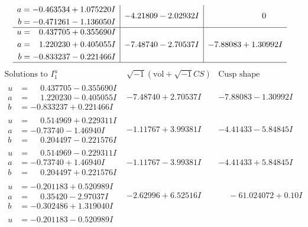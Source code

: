 \documentclass[1p]{elsarticle_modified}
\theoremstyle{definition}
\newcommand{\I}{\sqrt{-1}}
\begin{document}
$$\begin{array}{c|c|c}
\begin{aligned}
a &= -0.463534 + 1.075220 I \\
b &= -0.471261 - 1.136050 I\end{aligned}
 & -4.21809 - 2.02932 I & \phantom{-0.000000 } 0 \\ \hline\begin{aligned}
u &= \phantom{-}0.437705 + 0.355690 I \\
a &= \phantom{-}1.220230 + 0.405055 I \\
b &= -0.833237 - 0.221466 I\end{aligned}
 & -7.48740 - 2.70537 I & -7.88083 + 1.30992 I\\
 \hline 
 \end{array}$$\newpage$$\begin{array}{c|c|c}  
\text{Solutions to }I^u_{1}& \I (\text{vol} + \sqrt{-1}CS) & \text{Cusp shape}\\
 \hline 
\begin{aligned}
u &= \phantom{-}0.437705 - 0.355690 I \\
a &= \phantom{-}1.220230 - 0.405055 I \\
b &= -0.833237 + 0.221466 I\end{aligned}
 & -7.48740 + 2.70537 I & -7.88083 - 1.30992 I \\ \hline\begin{aligned}
u &= \phantom{-}0.514969 + 0.229311 I \\
a &= -0.73740 - 1.46940 I \\
b &= \phantom{-}0.204497 - 0.221576 I\end{aligned}
 & -1.11767 + 3.99381 I & -4.41433 - 5.84845 I \\ \hline\begin{aligned}
u &= \phantom{-}0.514969 - 0.229311 I \\
a &= -0.73740 + 1.46940 I \\
b &= \phantom{-}0.204497 + 0.221576 I\end{aligned}
 & -1.11767 - 3.99381 I & -4.41433 + 5.84845 I \\ \hline\begin{aligned}
u &= -0.201183 + 0.520989 I \\
a &= \phantom{-}0.35420 - 2.97037 I \\
b &= -0.302486 + 1.319040 I\end{aligned}
 & -2.62996 + 6.52516 I & \phantom{-}                -6
1.024072 + 0. 10   I\phantom{ +0.000000I} \\ \hline\begin{aligned}
u &= -0.201183 - 0.520989 I \\

\end{aligned}
\end{array}$$
\end{document}

